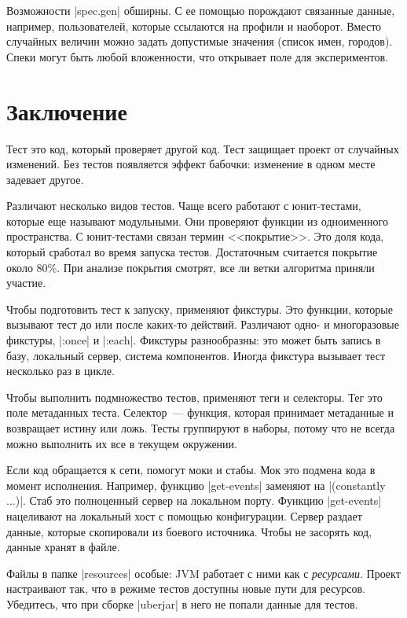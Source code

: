 Возможности \spverb|spec.gen| обширны. С ее помощью порождают связанные данные,
например, пользователей, которые ссылаются на профили и наоборот. Вместо
случайных величин можно задать допустимые значения (список имен, городов). Спеки
могут быть любой вложенности, что открывает поле для экспериментов.

\section{Заключение}

Тест это код, который проверяет другой код. Тест защищает проект от случайных
изменений. Без тестов появляется эффект бабочки: изменение в одном месте
задевает другое.

Различают несколько видов тестов. Чаще всего работают с юнит-тестами, которые
еще называют модульными. Они проверяют функции из одноименного пространства. С
юнит-тестами связан термин <<покрытие>>. Это доля кода, который сработал во
время запуска тестов. Достаточным считается покрытие около 80\%. При анализе
покрытия смотрят, все ли ветки алгоритма приняли участие.

Чтобы подготовить тест к запуску, применяют фикстуры. Это функции, которые
вызывают тест до или после каких-то действий. Различают одно- и многоразовые
фикстуры, \spverb|:once| и \spverb|:each|. Фикстуры разнообразны: это может быть
запись в базу, локальный сервер, система компонентов. Иногда фикстура вызывает
тест несколько раз в цикле.

Чтобы выполнить подмножество тестов, применяют теги и селекторы. Тег это поле
метаданных теста. Селектор~--- функция, которая принимает метаданные и
возвращает истину или ложь. Тесты группируют в наборы, потому что не всегда
можно выполнить их все в текущем окружении.

Если код обращается к сети, помогут моки и стабы. Мок это подмена кода в момент
исполнения. Например, функцию \spverb|get-events| заменяют на
\spverb|(constantly {...})|.  Стаб это полноценный сервер на локальном
порту. Функцию \spverb|get-events| нацеливают на локальный хост с помощью
конфигурации. Сервер раздает данные, которые скопировали из боевого
источника. Чтобы не засорять код, данные хранят в файле.

Файлы в папке \spverb|resources| особые: JVM работает с ними как с
\emph{ресурсами}. Проект настраивают так, что в режиме тестов доступны новые
пути для ресурсов. Убедитесь, что при сборке \spverb|uberjar| в него не попали
данные для тестов.

